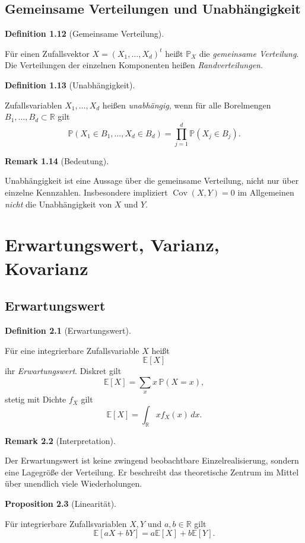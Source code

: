 \documentclass[10pt, letterpaper]{article}
\newcommand{\R}{\mathbb{R}}
\newcommand{\CustomHeading}[3]{%
  \par\medskip\noindent%
  \textbf{#1 #2} \textnormal{(#3)}.\enskip%
}
\newenvironment{DEF}[2]{\CustomHeading{Definition}{#1}{#2}}{}
\newenvironment{PROP}[2]{\CustomHeading{Proposition}{#1}{#2}}{}
\newenvironment{REM}[2]{\CustomHeading{Remark}{#1}{#2}}{}
\begin{document}
\subsection{Gemeinsame Verteilungen und Unabhängigkeit}

\begin{DEF}{1.12}{Gemeinsame Verteilung}
Für einen Zufallsvektor \(X=(X_1,\dots,X_d)^t\) heißt \(\mathbb P_X\) die \emph{gemeinsame Verteilung}. Die Verteilungen der einzelnen Komponenten heißen \emph{Randverteilungen}.
\end{DEF}

\begin{DEF}{1.13}{Unabhängigkeit}
Zufallsvariablen \(X_1,\dots,X_d\) heißen \emph{unabhängig}, wenn für alle Borelmengen \(B_1,\dots,B_d\subset\R\) gilt
\[
\mathbb P(X_1\in B_1,\dots,X_d\in B_d)
=
\prod_{j=1}^d \mathbb P(X_j\in B_j).
\]
\end{DEF}

\begin{REM}{1.14}{Bedeutung}
Unabhängigkeit ist eine Aussage über die gemeinsame Verteilung, nicht nur über einzelne Kennzahlen. Insbesondere impliziert \(\operatorname{Cov}(X,Y)=0\) im Allgemeinen \emph{nicht} die Unabhängigkeit von \(X\) und \(Y\).
\end{REM}

\section{Erwartungswert, Varianz, Kovarianz}

\subsection{Erwartungswert}

\begin{DEF}{2.1}{Erwartungswert}
Für eine integrierbare Zufallsvariable \(X\) heißt
\[
\mathbb E[X]
\]
ihr \emph{Erwartungswert}. Diskret gilt
\[
\mathbb E[X]=\sum_x x\,\mathbb P(X=x),
\]
stetig mit Dichte \(f_X\) gilt
\[
\mathbb E[X]=\int_{\R} x f_X(x)\,dx.
\]
\end{DEF}

\begin{REM}{2.2}{Interpretation}
Der Erwartungswert ist keine zwingend beobachtbare Einzelrealisierung, sondern eine Lagegröße der Verteilung. Er beschreibt das theoretische Zentrum im Mittel über unendlich viele Wiederholungen.
\end{REM}

\begin{PROP}{2.3}{Linearität}
Für integrierbare Zufallsvariablen \(X,Y\) und \(a,b\in\R\) gilt
\[
\mathbb E[aX+bY]=a\mathbb E[X]+b\mathbb E[Y].
\]
\end{PROP}
\end{document}
